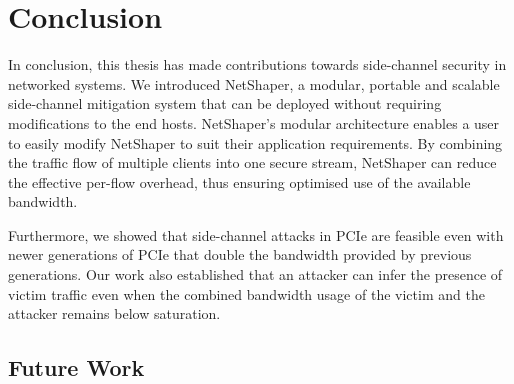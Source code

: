 \chapter{Conclusion}
\label{chap:conclusion}

In conclusion, this thesis has made contributions towards side-channel security in networked systems.
We introduced NetShaper, a modular, portable and scalable side-channel mitigation system that can be deployed without requiring modifications to the end hosts.
NetShaper's modular architecture enables a user to easily modify NetShaper to suit their application requirements.
By combining the traffic flow of multiple clients into one secure stream, NetShaper can reduce the effective per-flow overhead, thus ensuring optimised use of the available bandwidth.

Furthermore, we showed that side-channel attacks in PCIe are feasible even with newer generations of PCIe that double the bandwidth provided by previous generations.
Our work also established that an attacker can infer the presence of victim traffic even when the combined bandwidth usage of the victim and the attacker remains below saturation.

\section{Future Work}

